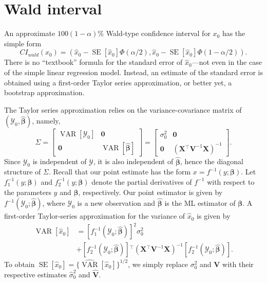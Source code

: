 \documentclass{article}\usepackage[]{graphicx}\usepackage[]{color}
\newcommand{\trans}{\ensuremath{^\top}}
\newcommand{\VAR}{\operatorname{VAR}}
\newcommand{\SE}{\operatorname{SE}}
\begin{document}

\section{Wald interval}\label{sec:wald}

An approximate $100(1-\alpha)\%$ Wald-type confidence interval for $x_0$ has the simple form
\begin{equation}
\label{eqn:wald}
  CI_{wald}\left(x_0\right) = \left( \widehat{x}_0 -  \SE\left[\widehat{x}_0\right]\Phi\left(\alpha/2\right),  \widehat{x}_0 -  \SE\left[\widehat{x}_0\right]\Phi\left(1-\alpha/2\right) \right).
\end{equation}
There is no ``textbook'' formula for the standard error of $\widehat{x}_0$---not even in the case of the simple linear regression model. Instead, an estimate of the standard error is obtained using a first-order Taylor series approximation, or better yet, a bootstrap approximation.  

The Taylor series approximation relies on the variance-covariance matrix of $\left(\mathcal{Y}_0, \widehat{\bm{\beta}}\right)$, namely,
\[
\Sigma = \begin{bmatrix}
           \VAR\left[\mathcal{Y}_0\right] & \bm{0} \\
           \bm{0} & \VAR\left[\widehat{\bm{\beta}}\right]
         \end{bmatrix} = \begin{bmatrix}
           \sigma_0^2 & \bm{0} \\
           \bm{0} & \left(\bm{X}\trans\bm{V}^{-1}\bm{X}\right)^{-1}
         \end{bmatrix}.
\]
Since $\mathcal{Y}_0$ is independent of $\bm{\mathcal{Y}}$, it is also independent of $\widehat{\bm{\beta}}$, hence the diagonal structure of $\Sigma$. Recall that our point estimate has the form $x = f^{-1}\left(y; \bm{\beta}\right)$. Let $f_1^{-1}\left(y; \bm{\beta}\right)$ and $f_2^{-1}\left(y; \bm{\beta}\right)$ denote the partial derivatives of $f^{-1}$ with respect to the parameters $y$ and $\bm{\beta}$, respectively. Our point estimator is given by $f^{-1}\left(\mathcal{Y}_0; \widehat{\bm{\beta}}\right)$, where $\mathcal{Y}_0$ is a new observation and $\widehat{\bm{\beta}}$ is the ML estimator of $\bm{\beta}$.  A first-order Taylor-series approximation for the variance of $\widehat{x}_0$ is given by
\begin{align}
  \VAR\left[\widehat{x}_0\right] &= \left[f_1^{-1}\left(\mathcal{Y}_0; \widehat{\bm{\beta}}\right)\right]^2\sigma_0^2 \nonumber \\
   &+ \left[f_2^{-1}\left(\mathcal{Y}_0; \widehat{\bm{\beta}}\right)\right]\trans\left(\bm{X}\trans\bm{V}^{-1}\bm{X}\right)^{-1}\left[f_2^{-1}\left(\mathcal{Y}_0; \widehat{\bm{\beta}}\right)\right].
\end{align}
To obtain $\SE\left[\widehat{x}_0\right] = \Big\{ \widehat{\VAR}\left[\widehat{x}_0\right] \Big\}^{1/2}$, we simply replace $\sigma_0^2$ and $\bm{V}$ with their respective estimates $\widehat{\sigma}_0^2$ and $\widehat{\bm{V}}$.
\end{document}
